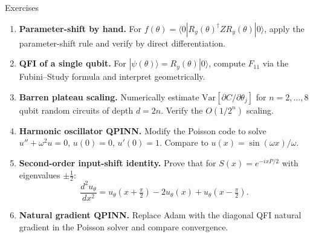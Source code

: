 \documentclass[aspectratio=169,11pt]{beamer}
\newcommand{\Variance}{\mathrm{Var}}
\begin{document}
\begin{frame}{Exercises}
  \begin{enumerate}\itemsep5pt
    \item \textbf{Parameter-shift by hand.}
          For $f(\theta)=\langle 0|R_y(\theta)^\dagger Z R_y(\theta)|0\rangle$,
          apply the parameter-shift rule and verify by direct
          differentiation.

    \item \textbf{QFI of a single qubit.}
          For $|\psi(\theta)\rangle = R_y(\theta)|0\rangle$,
          compute $F_{11}$ via the Fubini--Study formula and
          interpret geometrically.

    \item \textbf{Barren plateau scaling.}
          Numerically estimate
          $\Variance[\partial C/\partial\theta_j]$ for
          $n=2,\ldots,8$ qubit random circuits of depth $d=2n$.
          Verify the $O(1/2^n)$ scaling.

    \item \textbf{Harmonic oscillator QPINN.}
          Modify the Poisson code to solve $u''+\omega^2 u=0$,
          $u(0)=0$, $u'(0)=1$.
          Compare to $u(x)=\sin(\omega x)/\omega$.

    \item \textbf{Second-order input-shift identity.}
          Prove that for $S(x)=e^{-ixP/2}$ with
          eigenvalues $\pm\tfrac12$:
          \[
            \frac{d^2u_\theta}{dx^2}
            = u_\theta(x{+}\tfrac\pi2)
              - 2u_\theta(x)
              + u_\theta(x{-}\tfrac\pi2).
          \]

    \item \textbf{Natural gradient QPINN.}
          Replace Adam with the diagonal QFI natural gradient
          in the Poisson solver and compare convergence.
  \end{enumerate}
\end{frame}
\end{document}
